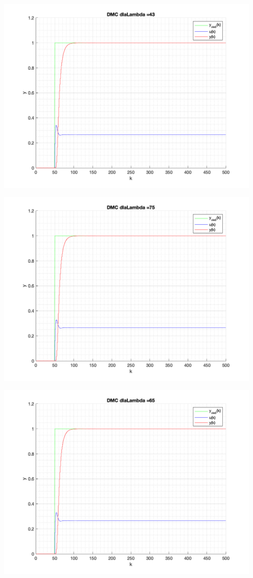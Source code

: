 \documentclass[a4paper, 11pt]{article}
\begin{document}
\begin{enumerate}
 \includegraphics[width=\linewidth]{./ModelsP4_Lambda/P4_DMC_Lambda_43_png.png} 
 
 \includegraphics[width=\linewidth]{./ModelsP4_Lambda/P4_DMC_Lambda_75_png.png} 
 
 \includegraphics[width=\linewidth]{./ModelsP4_Lambda/P4_DMC_Lambda_65_png.png} 
 

\end{enumerate}
\end{document}
